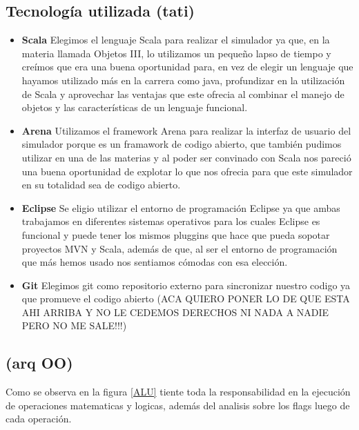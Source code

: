 \subsection{Tecnología utilizada (tati)}

\begin{itemize}


\item  \textbf{Scala}
Elegimos el lenguaje Scala para realizar el simulador ya que, en la materia llamada Objetos III, lo utilizamos un pequeño lapso de tiempo y creímos que era una buena oportunidad para, en vez de elegir un lenguaje que hayamos utilizado más en la carrera como java, profundizar en la utilización de Scala y aprovechar las ventajas que este ofrecia al combinar el manejo de objetos y las características de un lenguaje funcional.

\item  \textbf{Arena}
Utilizamos el framework Arena para realizar la interfaz de usuario del simulador porque es un framawork de codigo abierto, que también pudimos utilizar en una de las materias y al poder ser convinado con Scala nos pareció una buena oportunidad de explotar lo que nos ofrecia para que este simulador en su totalidad sea de codigo abierto.

\item  \textbf{Eclipse}
Se eligio utilizar el entorno de programación Eclipse ya que ambas trabajamos en diferentes sistemas operativos para los cuales Eclipse es funcional y puede tener los mismos pluggins que hace que pueda sopotar proyectos MVN y Scala, además de que, al ser el entorno de programación que más hemos usado nos sentiamos cómodas con esa elección.

\item  \textbf{Git}
Elegimos git como repositorio externo para sincronizar nuestro codigo ya que promueve el codigo abierto (ACA QUIERO PONER LO DE QUE ESTA AHI ARRIBA Y NO LE CEDEMOS DERECHOS NI NADA  A NADIE PERO NO ME SALE!!!)

\end{itemize}

\subsection{ (arq OO)}

Como se observa en la figura \ref{ALU} tiente toda la responsabilidad en la ejecución de operaciones matematicas y logicas, además del analisis sobre los flags luego de cada operación. 

